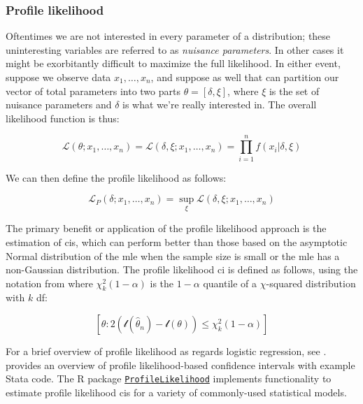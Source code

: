 \documentclass{report}
\begin{document}
\subsubsection{Profile likelihood}

Oftentimes we are not interested in every parameter of a distribution; these uninteresting variables are referred to as \textit{nuisance parameters}. In other cases it might be exorbitantly difficult to maximize the full likelihood. In either event, suppose we observe data $x_1, \dots, x_n$, and suppose as well that can partition our vector of total parameters into two parts $\theta = [\delta, \xi]$, where $\xi$ is the set of nuisance parameters and $\delta$ is what we're really interested in. The overall likelihood function is thus:

\begin{equation}\label{eq:profile-likelihood-1}
    \mathcal{L}(\theta; x_1, \dots, x_n) = \mathcal{L}(\delta, \xi; x_1, \dots, x_n) = \prod_{i=1}^n f(x_i|\delta, \xi) 
\end{equation}

We can then define the profile likelihood as follows:

\begin{equation}\label{eq:profile-likelihood-2}
    \mathcal{L}_P(\delta; x_1, \dots, x_n) = \sup_{\xi} \mathcal{L}(\delta, \xi; x_1, \dots, x_n)
\end{equation}

The primary benefit or application of the profile likelihood approach is the estimation of \glspl{ci}, which can perform better than those based on the asymptotic Normal distribution of the \gls{mle} when the sample size is small or the \gls{mle} has a non-Gaussian distribution. The profile likelihood \gls{ci} is defined as follows, using the notation from \cite{venzon_method_1988} where $\chi^2_k(1-\alpha)$ is the $1-\alpha$ quantile of a $\chi$-squared distribution with $k$ \gls{df}:

\begin{equation}\label{eq:profile-likelihood-ci}
    \left[\theta \colon 2\left(\mathcal{l}\left(\hat{\theta}_n\right) - \mathcal{l}(\theta)\right) \leq \chi^2_k(1-\alpha)\right]
\end{equation}

For a brief overview of profile likelihood as regards logistic regression, see \cite{cole_maximum_2014}. \cite{royston_profile_2007} provides an overview of profile likelihood-based confidence intervals with example Stata code. The R package \href{https://cran.r-project.org/web/packages/ProfileLikelihood/}{\texttt{ProfileLikelihood}} implements functionality to estimate profile likelihood \glspl{ci} for a variety of commonly-used statistical models. 
\end{document}
